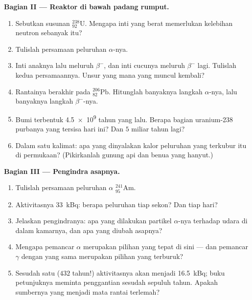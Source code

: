 \begin{problem}
\medskip
\noindent\textbf{Bagian II --- Reaktor di bawah padang rumput.}
\begin{enumerate}[resume]
  \item Sebutkan susunan ${}^{238}_{92}\mathrm{U}$. Mengapa inti yang berat
        memerlukan kelebihan neutron sebanyak itu?
  \item Tulislah persamaan peluruhan $\alpha$-nya.
  \item Inti anaknya lalu meluruh $\beta^-$, dan inti cucunya meluruh
        $\beta^-$ lagi. Tulislah kedua persamaannya. Unsur yang mana yang
        muncul kembali?
  \item Rantainya berakhir pada ${}^{206}_{82}\mathrm{Pb}$. Hitunglah
        banyaknya langkah $\alpha$-nya, lalu banyaknya langkah
        $\beta^-$-nya.
  \item Bumi terbentuk \num{4.5e9} tahun yang lalu. Berapa bagian
        uranium-238 purbanya yang tersisa hari ini? Dan $5$ miliar tahun
        lagi?
  \item Dalam satu kalimat: apa yang dinyalakan kalor peluruhan yang
        terkubur itu di permukaan? (Pikirkanlah gunung api dan benua yang
        hanyut.)
\end{enumerate}

\medskip
\noindent\textbf{Bagian III --- Pengindra asapnya.}
\begin{enumerate}[resume]
  \item Tulislah persamaan peluruhan $\alpha$ ${}^{241}_{95}\mathrm{Am}$.
  \item Aktivitasnya \qty{33}{kBq}: berapa peluruhan tiap sekon? Dan tiap
        hari?
  \item Jelaskan pengindranya: apa yang dilakukan partikel $\alpha$-nya
        terhadap udara di dalam kamarnya, dan apa yang diubah asapnya?
  \item Mengapa pemancar $\alpha$ merupakan pilihan yang tepat di sini ---
        dan pemancar $\gamma$ dengan  yang sama merupakan pilihan
        yang terburuk?
  \item Sesudah satu  ($432$ tahun!) aktivitasnya akan menjadi
        \qty{16.5}{kBq}; buku petunjuknya meminta penggantian sesudah
        sepuluh tahun. Apakah sumbernya yang menjadi mata rantai terlemah?
\end{enumerate}


\end{problem}
